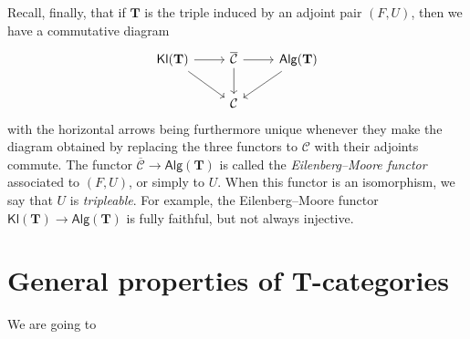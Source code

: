 \documentclass{article}
\newcommand{\cat}[1]{\mathcal{#1}}
\newcommand{\Cat}[1]{\mathsf{#1}}
\newcommand{\TT}{\mathbf{T}}
\newcommand{\Alg}[1]{\Cat{Alg}(#1)}
\newcommand{\Kl}[1]{\Cat{Kl}(#1)}
\begin{document}
Recall, finally, that if $\TT$ is the triple induced by an adjoint pair $(F,U)$, then we have a commutative diagram
\[
  \begin{tikzcd}
    \Kl{\TT} \ar[r] \ar[dr]
  & \overline{\cat{C}} \ar[r] \ar[d]
  & \Alg{\TT} \ar[dl]
  \\
  & \cat{C}
  \end{tikzcd}
\]
with the horizontal arrows being furthermore unique whenever they make the diagram obtained by replacing the three functors to $\cat{C}$ with their adjoints commute.
The functor $\overline{\cat{C}}\to\Alg{\TT}$ is called the \emph{Eilenberg--Moore functor} associated to $(F,U)$, or simply to $U$.
When this functor is an isomorphism, we say that $U$ is \emph{tripleable}.
For example, the Eilenberg--Moore functor $\Kl{\TT}\to\Alg{\TT}$ is fully faithful, but not always injective.




\section{General properties of $\TT$-categories}

We are going to





\nocite{*}
\printbibliography[heading=bibintoc,title=Bibliography]
\end{document}
